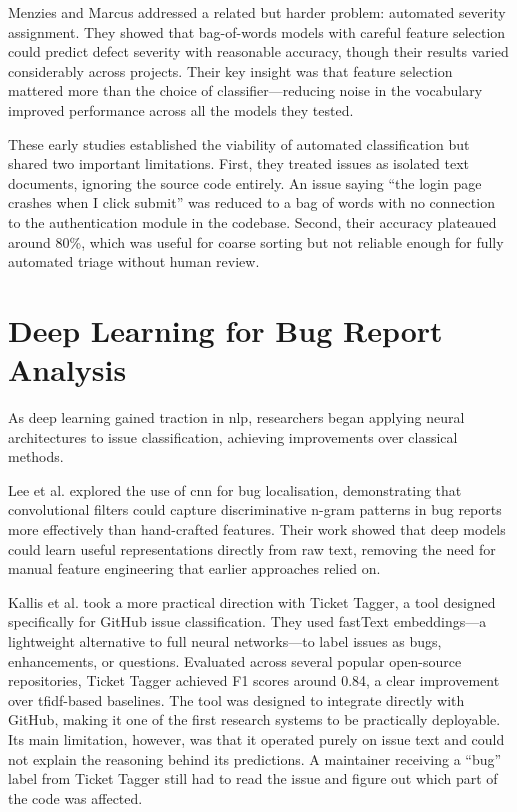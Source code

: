 Menzies and Marcus \cite{Menzies2008} addressed a related but harder problem: automated severity assignment. They showed that bag-of-words models with careful feature selection could predict defect severity with reasonable accuracy, though their results varied considerably across projects. Their key insight was that feature selection mattered more than the choice of classifier---reducing noise in the vocabulary improved performance across all the models they tested.

These early studies established the viability of automated classification but shared two important limitations. First, they treated issues as isolated text documents, ignoring the source code entirely. An issue saying ``the login page crashes when I click submit'' was reduced to a bag of words with no connection to the authentication module in the codebase. Second, their accuracy plateaued around 80\%, which was useful for coarse sorting but not reliable enough for fully automated triage without human review.

\section{\textbf{Deep Learning for Bug Report Analysis}}

As deep learning gained traction in \gls{nlp}, researchers began applying neural architectures to issue classification, achieving improvements over classical methods.

Lee et al. \cite{Lee2017} explored the use of \gls{cnn} for bug localisation, demonstrating that convolutional filters could capture discriminative n-gram patterns in bug reports more effectively than hand-crafted features. Their work showed that deep models could learn useful representations directly from raw text, removing the need for manual feature engineering that earlier approaches relied on.

Kallis et al. \cite{Kallis2019} took a more practical direction with Ticket Tagger, a tool designed specifically for GitHub issue classification. They used fastText embeddings---a lightweight alternative to full neural networks---to label issues as bugs, enhancements, or questions. Evaluated across several popular open-source repositories, Ticket Tagger achieved F1 scores around 0.84, a clear improvement over \gls{tfidf}-based baselines. The tool was designed to integrate directly with GitHub, making it one of the first research systems to be practically deployable. Its main limitation, however, was that it operated purely on issue text and could not explain the reasoning behind its predictions. A maintainer receiving a ``bug'' label from Ticket Tagger still had to read the issue and figure out which part of the code was affected.


